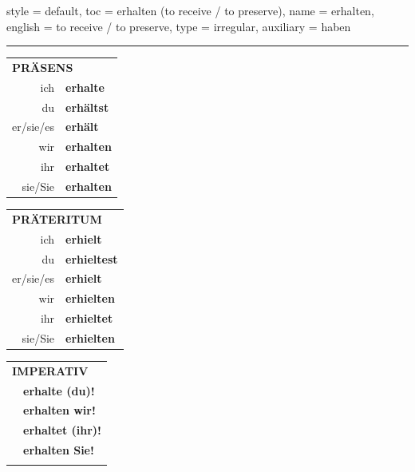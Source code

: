 \begin{verbentry}{
  style = {default},
  toc = {erhalten (to receive / to preserve)},
  name = {erhalten},
  english = {to receive / to preserve},
  type = {irregular},
  auxiliary = {haben}
}
 
    
     \vspace{5pt}

    \hrule
    
    \vspace{5pt}

  \begin{tabular}{rl}
     \multicolumn{2}{l}{\textbf{PRÄSENS} }\\
    ich & \textbf{erhalte}\\
    du & \textbf{erhältst}\\
    er/sie/es & \textbf{erhält}\\
    wir & \textbf{erhalten}\\
    ihr & \textbf{erhaltet}\\
    sie/Sie & \textbf{erhalten}\\
  \end{tabular}
  \hfill
     \begin{tabular}{rl}
    \multicolumn{2}{l}{\textbf{PRÄTERITUM} }\\
    ich & \textbf{erhielt}\\
    du & \textbf{erhieltest}\\
    er/sie/es & \textbf{erhielt}\\
    wir & \textbf{erhielten}\\
    ihr & \textbf{erhieltet}\\
    sie/Sie & \textbf{erhielten}\\
  \end{tabular}
  \hfill
  \begin{tabular}{rl}
     \multicolumn{2}{l}{\textbf{IMPERATIV} }\\
   & \textbf{erhalte (du)!}\\
   & \textbf{erhalten wir!}\\
   & \textbf{erhaltet (ihr)!}\\
   & \textbf{erhalten Sie!}\\
   & \vspace{10pt}
  \end{tabular}

    \vspace{10pt}


\end{verbentry}
